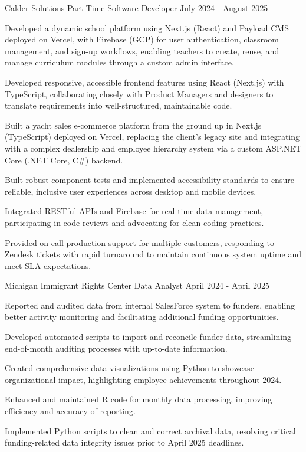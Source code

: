 \documentclass{../styles/cv}
\begin{document}
\subsectionpositiondate
    {Calder Solutions}
    {Part-Time Software Developer}
    {July 2024 - August 2025}
\resumesublistbegin
    \item Developed a dynamic school platform using Next.js (React) and Payload CMS deployed on Vercel, with Firebase (GCP) for user authentication, classroom management, and sign-up workflows, enabling teachers to create, reuse, and manage curriculum modules through a custom admin interface.
    \item Developed responsive, accessible frontend features using React (Next.js) with TypeScript, collaborating closely with Product Managers and designers to translate requirements into well-structured, maintainable code.
    \item Built a yacht sales e-commerce platform from the ground up in Next.js (TypeScript) deployed on Vercel, replacing the client's legacy site and integrating with a complex dealership and employee hierarchy system via a custom ASP.NET Core (.NET Core, C\#) backend.
    \item Built robust component tests and implemented accessibility standards to ensure reliable, inclusive user experiences across desktop and mobile devices.
    \item Integrated RESTful APIs and Firebase for real-time data management, participating in code reviews and advocating for clean coding practices.
    \item Provided on-call production support for multiple customers, responding to Zendesk tickets with rapid turnaround to maintain continuous system uptime and meet SLA expectations.
\resumesublistend

\subsectionpositiondate
    {Michigan Immigrant Rights Center}
    {Data Analyst}
    {April 2024 - April 2025}
\resumesublistbegin
    \item Reported and audited data from internal SalesForce system to funders, enabling better activity monitoring and facilitating additional funding opportunities.
    \item Developed automated scripts to import and reconcile funder data, streamlining end-of-month auditing processes with up-to-date information.
    \item Created comprehensive data visualizations using Python to showcase organizational impact, highlighting employee achievements throughout 2024.
    \item Enhanced and maintained R code for monthly data processing, improving efficiency and accuracy of reporting.
    \item Implemented Python scripts to clean and correct archival data, resolving critical funding-related data integrity issues prior to April 2025 deadlines.
\resumesublistend
\end{document}
